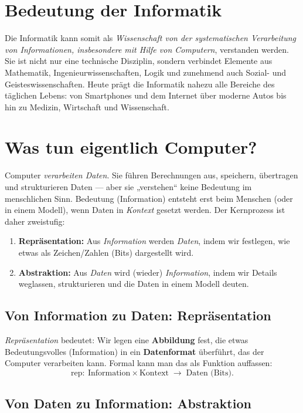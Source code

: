 \documentclass[12pt,a4paper]{book}
\begin{document}
\section{Bedeutung der Informatik}
Die Informatik kann somit als \emph{Wissenschaft von der systematischen Verarbeitung von Informationen, insbesondere mit Hilfe von Computern}, verstanden werden. 
Sie ist nicht nur eine technische Disziplin, sondern verbindet Elemente aus 
Mathematik, Ingenieurwissenschaften, Logik und zunehmend auch Sozial- und Geisteswissenschaften. 
Heute prägt die Informatik nahezu alle Bereiche des täglichen Lebens: 
von Smartphones und dem Internet über moderne Autos bis hin zu Medizin, Wirtschaft und Wissenschaft.

\section{Was tun eigentlich Computer?}

Computer \emph{verarbeiten Daten}. Sie führen Berechnungen aus, speichern, übertragen und strukturieren Daten — aber sie „verstehen“ keine Bedeutung im menschlichen Sinn. Bedeutung (Information) entsteht erst beim Menschen (oder in einem Modell), wenn Daten in \emph{Kontext} gesetzt werden. Der Kernprozess ist daher zweistufig:

\begin{enumerate}
	\item \textbf{Repräsentation:} Aus \emph{Information} werden \emph{Daten}, indem wir festlegen, wie etwas als Zeichen/Zahlen (Bits) dargestellt wird.
	\item \textbf{Abstraktion:} Aus \emph{Daten} wird (wieder) \emph{Information}, indem wir Details weglassen, strukturieren und die Daten in einem Modell deuten.
\end{enumerate}

\subsection{Von Information zu Daten: Repräsentation}

\emph{Repräsentation} bedeutet: Wir legen eine \textbf{Abbildung} fest, die etwas Bedeutungsvolles (Information) in ein \textbf{Datenformat} überführt, das der Computer verarbeiten kann.
Formal kann man das als Funktion auffassen:
\[
\mathrm{rep}:\ \text{Information} \times \text{Kontext} \;\to\; \text{Daten (Bits)}.
\]


\subsection{Von Daten zu Information: Abstraktion}
\end{document}
